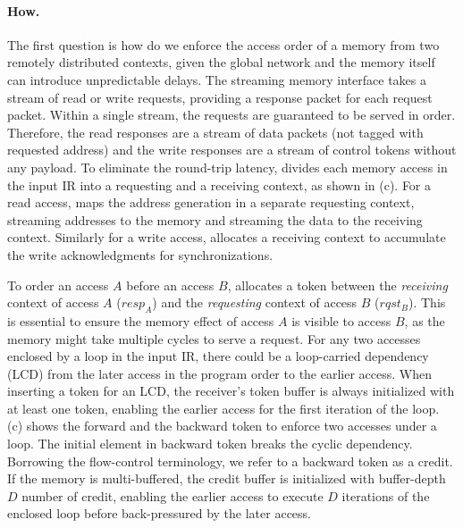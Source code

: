 
\paragraph{How.} 
The first question is how do we enforce the access order of a memory from two remotely distributed contexts, given the
global network and the memory itself can introduce unpredictable delays.
The streaming memory interface takes a stream of read or write requests, providing a response
packet for each request packet.
Within a single stream, the requests are guaranteed to be served in order. 
Therefore, the read responses are a stream of data packets (not tagged with requested address) and the
write responses are a stream of control tokens without any payload.
To eliminate the round-trip latency, \name divides each memory access in the input IR into a requesting and a receiving context, as shown in  (c). 
For a read access, \name maps the address generation in a separate requesting context, streaming
addresses to the memory and streaming the data to the receiving context.
Similarly for a write access, \name allocates a receiving context to accumulate the write acknowledgments 
for synchronizations.

To order an access $A$ before an access $B$,
\name allocates a token between the \emph{receiving} context of access $A$ ($resp_A$) and the
\emph{requesting} context of access $B$ ($rqst_B$).
This is essential to ensure the memory effect of access $A$ is visible to access $B$, as the memory
might take multiple cycles to serve a request.
For any two accesses enclosed by a loop in the input IR, there could be a loop-carried dependency (LCD) from
the later access in the program order to the earlier access.
When inserting a token for an LCD, the receiver's token buffer is always initialized with at least one token,
enabling the earlier access for the first iteration of the loop.  (c) shows the
forward and the backward token to enforce two accesses under a loop. The initial element in backward
token breaks the cyclic dependency. 
Borrowing the flow-control
terminology\cite{credit}, we refer to a backward token as a credit.
If the memory is multi-buffered, the credit buffer is initialized with buffer-depth $D$ number of credit, 
enabling the earlier access to execute $D$ iterations of the enclosed loop before back-pressured by
the later access.

